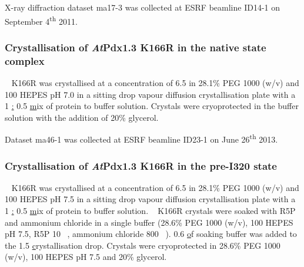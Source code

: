 X-ray diffraction dataset ma17-3 was collected at ESRF beamline ID14-1 on September 4\textsuperscript{th} 2011. %


 	
\subsubsection{Crystallisation of \textit{At}Pdx1.3 K166R in the native state complex}
\atpdx~ K166R was crystallised at a concentration of 6.5 \mgml in 28.1\% PEG 1000 (w/v) and 100 \mM HEPES pH 7.0 in a sitting drop vapour diffusion crystallisation plate with a 1 \ul : 0.5 \ul mix of protein to buffer solution. Crystals were cryoprotected in the buffer solution with the addition of 20\% glycerol. 

Dataset ma46-1 was collected at ESRF beamline ID23-1 on June 26\textsuperscript{th} 2013. %

\subsubsection{Crystallisation of \textit{At}Pdx1.3 K166R in the pre-I320 state}
\atpdx~ K166R was crystallised at a concentration of 6.5 \mgml in 28.1\% PEG 1000 (w/v) and 100 \mM HEPES pH 7.5 in a sitting drop vapour diffusion crystallisation plate with a 1 \ul : 0.5 \ul mix of protein to buffer solution. \atpdx~ K166R crystals were soaked with R5P and ammonium chloride in a single buffer (28.6\% PEG 1000 (w/v), 100 \mM HEPES pH 7.5, R5P 10 \si{\milli\molar}, ammonium chloride 800 \si{\milli\molar}). 0.6 \ul of soaking buffer was added to the 1.5 \ul crystallisation drop. Crystals were cryoprotected in 28.6\% PEG 1000 (w/v), 100 \mM HEPES pH 7.5 and 20\% glycerol. 

